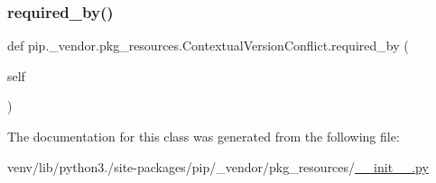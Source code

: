\subsubsection{\texorpdfstring{required\+\_\+by()}{required\_by()}}
{\footnotesize\ttfamily def pip.\+\_\+vendor.\+pkg\+\_\+resources.\+Contextual\+Version\+Conflict.\+required\+\_\+by (\begin{DoxyParamCaption}\item[{}]{self }\end{DoxyParamCaption})}



The documentation for this class was generated from the following file\+:\begin{DoxyCompactItemize}
\item 
venv/lib/python3./site-\/packages/pip/\+\_\+vendor/pkg\+\_\+resources/\hyperlink{venv_2lib_2python3_89_2site-packages_2pip_2__vendor_2pkg__resources_2____init_____8py}{\+\_\+\+\_\+init\+\_\+\+\_\+.\+py}\end{DoxyCompactItemize}
